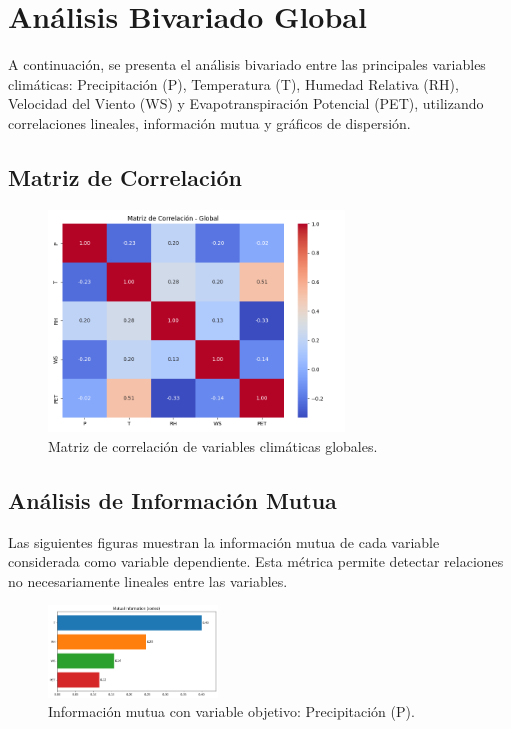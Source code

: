 \section{Análisis Bivariado Global}

A continuación, se presenta el análisis bivariado entre las principales variables climáticas: Precipitación (P), Temperatura (T), Humedad Relativa (RH), Velocidad del Viento (WS) y Evapotranspiración Potencial (PET), utilizando correlaciones lineales, información mutua y gráficos de dispersión.

\subsection{Matriz de Correlación}

\begin{figure}[H]
    \centering
    \includegraphics[width=0.7\textwidth]{resultados/global/bivariado/matriz_correlacion.png}
    \caption{Matriz de correlación de variables climáticas globales.}
    \label{fig:matriz_correlacion}
\end{figure}


\subsection{Análisis de Información Mutua}

Las siguientes figuras muestran la información mutua de cada variable considerada como variable dependiente. Esta métrica permite detectar relaciones no necesariamente lineales entre las variables.

\begin{figure}[H]
    \centering
    \includegraphics[width=0.4\textwidth]{resultados/global/bivariado/mutual_info_P.png}
    \caption{Información mutua con variable objetivo: Precipitación (P).}
    \label{fig:mutual_info_P}
\end{figure}

